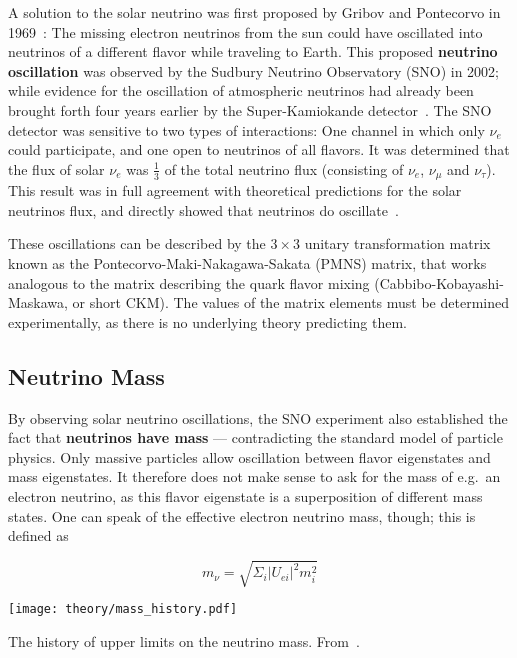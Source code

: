 A solution to the solar neutrino was first proposed by Gribov and Pontecorvo in 1969~: The missing electron neutrinos from the sun could have oscillated into neutrinos of a different flavor while traveling to Earth. This proposed \textbf{neutrino oscillation} was observed by the Sudbury Neutrino Observatory (SNO) in 2002; while evidence for the oscillation of atmospheric neutrinos had already been brought forth four years earlier by the Super-Kamiokande detector~. The SNO detector was sensitive to two types of interactions: One channel in which only $\nu_e$ could participate, and one open to neutrinos of all flavors. It was determined that the flux of solar $\nu_e$ was $\frac{1}{3}$ of the total neutrino flux (consisting of $\nu_e$, $\nu_\mu$ and $\nu_\tau$). This result was in full agreement with theoretical predictions for the solar neutrinos flux, and directly showed that neutrinos do oscillate~.

These oscillations can be described by the $3\times3$ unitary transformation matrix known as the Pontecorvo-Maki-Nakagawa-Sakata (PMNS) matrix, that works analogous to the matrix describing the quark flavor mixing (Cabbibo-Kobayashi-Maskawa, or short CKM). The values of the matrix elements must be determined experimentally, as there is no underlying theory predicting them.

\subsection{Neutrino Mass}
By observing solar neutrino oscillations, the SNO experiment also established the fact that \textbf{neutrinos have mass} --- contradicting the standard model of particle physics. Only massive particles allow oscillation between flavor eigenstates and mass eigenstates. It therefore does not make sense to ask for the mass of e.g.\ an electron neutrino, as this flavor eigenstate is a superposition of different mass states. One can speak of the effective electron neutrino mass, though; this is defined as

\begin{equation}\label{pmns}
    m_\nu = \sqrt{ \Sigma_i |U_{ei}|^2 m_i^2 }
\end{equation}

\begin{marginfigure}
    \texttt{[image: theory/mass\_history.pdf]}
    \caption[Neutrino mass upper limit history]{The history of upper limits on the neutrino mass. From~\cite{Aker2022}.}
\end{marginfigure}

